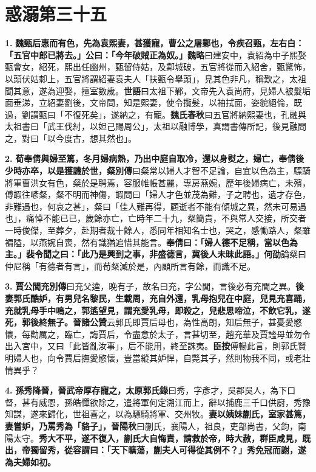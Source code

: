 \chapter{惑溺第三十五}

\textbf{1.} \textbf{魏甄后惠而有色，先為袁熙妻，甚獲寵，曹公之屠鄴也，令疾召甄，左右白：「五官中郎已將去。」公曰：「今年破賊正為奴。」}{\footnotesize \textbf{魏略}曰建安中，袁紹為中子熙娶甄會女，紹死，熙出任幽州，甄留侍姑，及鄴城破，五官將從而入紹舍，甄驚怖，以頭伏姑厀上，五官將謂紹妻袁夫人「扶甄令舉頭」，見其色非凡，稱歎之，太祖聞其意，遂為迎娶，擅室數歲。\textbf{世語}曰太祖下鄴，文帝先入袁尚府，見婦人被髮垢面垂涕，立紹妻劉後，文帝問，知是熙妻，使令攬髮，以袖拭面，姿貌絕倫，既過，劉謂甄曰「不復死矣」，遂納之，有寵。\textbf{魏氏春秋}曰五官將納熙妻也，孔融與太祖書曰「武王伐紂，以妲己賜周公」，太祖以融博學，真謂書傳所記，後見融問之，對曰「以今度古，想其然也」。}

\textbf{2.} \textbf{荀奉倩與婦至篤，冬月婦病熱，乃出中庭自取冷，還以身熨之，婦亡，奉倩後少時亦卒，以是獲譏於世，}{\footnotesize \textbf{粲別傳}曰粲常以婦人才智不足論，自宜以色為主，驃騎將軍曹洪女有色，粲於是聘焉，容服帷帳甚麗，專房燕婉，歷年後婦病亡，未殯，傅嘏往喭粲，粲不明而神傷，嘏問曰「婦人才色並茂為難，子之聘也，遺才存色，非難遇也，何哀之甚」，粲曰「佳人難再得，顧逝者不能有傾城之異，然未可易遇也」，痛悼不能已已，歲餘亦亡，亡時年二十九，粲簡貴，不與常人交接，所交者一時俊傑，至葬夕，赴期者裁十餘人，悉同年相知名士也，哭之，感慟路人，粲雖褊隘，以燕婉自喪，然有識猶追惜其能言。}\textbf{奉倩曰：「婦人德不足稱，當以色為主。」裴令聞之曰：「此乃是興到之事，非盛德言，冀後人未昧此語。」}{\footnotesize \textbf{何劭}論粲曰仲尼稱「有德者有言」，而荀粲減於是，內顧所言有餘，而識不足。}

\textbf{3.} \textbf{賈公閭}{\footnotesize \textbf{充別傳}曰充父逵，晚有子，故名曰充，字公閭，言後必有充閭之異。}\textbf{後妻郭氏酷妒，有男兒名黎民，生載周，充自外還，乳母抱兒在中庭，兒見充喜踊，充就乳母手中嗚之，郭遙望見，謂充愛乳母，即殺之，兒悲思啼泣，不飲它乳，遂死，郭後終無子。}{\footnotesize \textbf{晉諸公贊}云郭氏即賈后母也，為性高朗，知后無子，甚憂愛愍懷，每勸厲之，臨亡，誨賈后，令盡意於太子，言甚切至，趙充華及賈謐母並勿令出入宮中，又曰「此皆亂汝事」，后不能用，終至誅夷。\textbf{臣按}傅暢此言，則郭氏賢明婦人也，向令賈后撫愛愍懷，豈當縱其妒悍，自斃其子，然則物我不同，或老壯情異乎？}

\textbf{4.} \textbf{孫秀降晉，晉武帝厚存寵之，}{\footnotesize \textbf{太原郭氏錄}曰秀，字彥才，吳郡吳人，為下口督，甚有威恩，孫皓憚欲除之，遣將軍何定溯江而上，辭以捕鹿三千口供廚，秀豫知謀，遂來歸化，世祖喜之，以為驃騎將軍、交州牧。}\textbf{妻以姨妹蒯氏，室家甚篤，妻嘗妒，乃罵秀為「貉子」，}{\footnotesize \textbf{晉陽秋}曰蒯氏，襄陽人，祖良，吏部尚書，父鈞，南陽太守。}\textbf{秀大不平，遂不復入，蒯氏大自悔責，請救於帝，時大赦，群臣咸見，既出，帝獨留秀，從容謂曰：「天下曠蕩，蒯夫人可得從其例不？」秀免冠而謝，遂為夫婦如初。}

